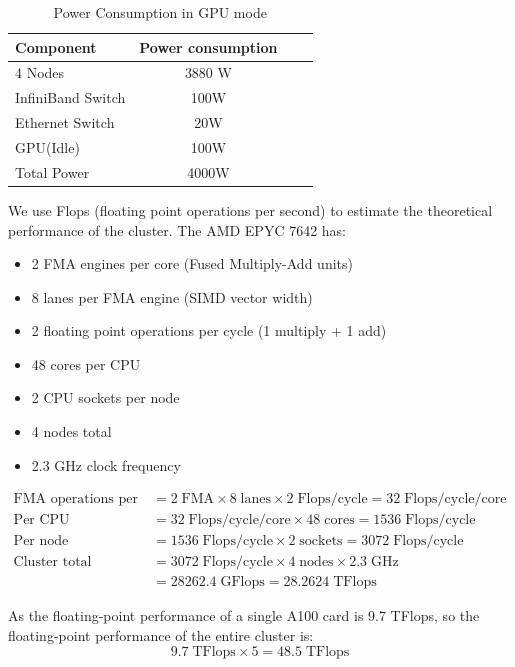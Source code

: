 \documentclass[a4paper,12pt]{article}
\begin{document}
\begin{table}[H]
\centering
\vspace{0.5cm}
\begin{tabular}{lccc}  %
\toprule
Component & Power consumption \\
\midrule
4 Nodes & 3880 W \\
InfiniBand Switch & 100W \\
Ethernet Switch & 20W \\
GPU(Idle) & 100W \\
Total Power & 4000W \\
\bottomrule
\end{tabular}
\caption{Power Consumption in GPU mode}
\end{table}

We use Flops (floating point operations per second) to estimate the theoretical performance of the cluster.
The AMD EPYC 7642 has:
\begin{itemize}
    \item 2 FMA engines per core (Fused Multiply-Add units)
    \item 8 lanes per FMA engine (SIMD vector width)  
    \item 2 floating point operations per cycle (1 multiply + 1 add)
    \item 48 cores per CPU
    \item 2 CPU sockets per node
    \item 4 nodes total
    \item 2.3 GHz clock frequency
\end{itemize}

\begin{align*}
\text{FMA operations per cycle} &= 2\;\text{FMA} \times 8\;\text{lanes} \times 2\;\text{Flops/cycle} = 32\;\text{Flops/cycle/core} \\
\text{Per CPU} &= 32\;\text{Flops/cycle/core} \times 48\;\text{cores} = 1536\;\text{Flops/cycle} \\
\text{Per node} &= 1536\;\text{Flops/cycle} \times 2\;\text{sockets} = 3072\;\text{Flops/cycle} \\
\text{Cluster total} &= 3072\;\text{Flops/cycle} \times 4\;\text{nodes} \times 2.3\;\text{GHz} \\
&= 28262.4\;\text{GFlops} = 28.2624\;\text{TFlops}
\end{align*}

As the floating-point performance of a single A100 card is 9.7 TFlops, so the floating-point performance of the entire cluster is:
\begin{equation*}
9.7\;\text{TFlops} \times 5 = 48.5 \;\text{TFlops}
\end{equation*}
\end{document}
